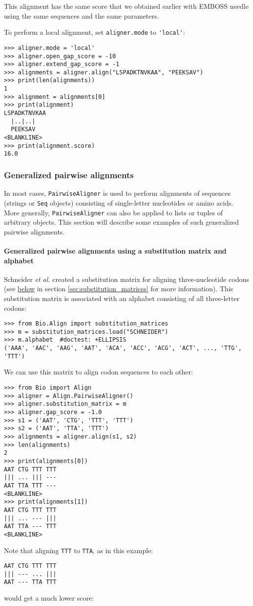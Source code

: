 This alignment has the same score that we obtained earlier with EMBOSS needle
using the same sequences and the same parameters.

To perform a local alignment, set \verb+aligner.mode+ to \verb+'local'+:

\begin{verbatim}
>>> aligner.mode = 'local'
>>> aligner.open_gap_score = -10
>>> aligner.extend_gap_score = -1
>>> alignments = aligner.align("LSPADKTNVKAA", "PEEKSAV")
>>> print(len(alignments))
1
>>> alignment = alignments[0]
>>> print(alignment)
LSPADKTNVKAA
  |..|..|   
  PEEKSAV   
<BLANKLINE>
>>> print(alignment.score)
16.0
\end{verbatim}

\subsubsection{Generalized pairwise alignments}
\label{sec:generalized-pairwise}

In most cases, \verb+PairwiseAligner+ is used to perform alignments of sequences (strings or \verb+Seq+ objects) consisting of single-letter nucleotides or amino acids. More generally, \verb+PairwiseAligner+ can also be applied to lists or tuples of arbitrary objects. This section will describe some examples of such generalized pairwise alignments.

\paragraph*{Generalized pairwise alignments using a substitution matrix and alphabet}

Schneider \textit{et al.} \cite{schneider2005} created a substitution matrix for aligning three-nucleotide codons (see \hyperlink{codonmatrix}{below} in section \ref{sec:substitution_matrices} for more information). This substitution matrix is associated with an alphabet consisting of all three-letter codons:

\begin{verbatim}
>>> from Bio.Align import substitution_matrices
>>> m = substitution_matrices.load("SCHNEIDER")
>>> m.alphabet  #doctest: +ELLIPSIS
('AAA', 'AAC', 'AAG', 'AAT', 'ACA', 'ACC', 'ACG', 'ACT', ..., 'TTG', 'TTT')
\end{verbatim}
We can use this matrix to align codon sequences to each other:

\begin{verbatim}
>>> from Bio import Align
>>> aligner = Align.PairwiseAligner()
>>> aligner.substitution_matrix = m
>>> aligner.gap_score = -1.0
>>> s1 = ('AAT', 'CTG', 'TTT', 'TTT')
>>> s2 = ('AAT', 'TTA', 'TTT')
>>> alignments = aligner.align(s1, s2)
>>> len(alignments)
2
>>> print(alignments[0])
AAT CTG TTT TTT
||| ... ||| ---
AAT TTA TTT ---
<BLANKLINE>
>>> print(alignments[1])
AAT CTG TTT TTT
||| ... --- |||
AAT TTA --- TTT
<BLANKLINE>
\end{verbatim}
Note that aligning \verb+TTT+ to \verb+TTA+, as in this example:
\begin{verbatim}
AAT CTG TTT TTT
||| --- ... |||
AAT --- TTA TTT
\end{verbatim}
would get a much lower score:

